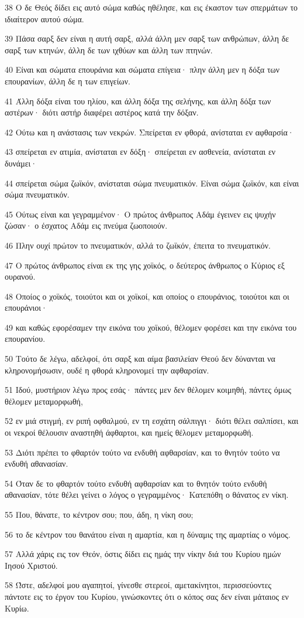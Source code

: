 \par 38 Ο δε Θεός δίδει εις αυτό σώμα καθώς ηθέλησε, και εις έκαστον των σπερμάτων το ιδιαίτερον αυτού σώμα.
\par 39 Πάσα σαρξ δεν είναι η αυτή σαρξ, αλλά άλλη μεν σαρξ των ανθρώπων, άλλη δε σαρξ των κτηνών, άλλη δε των ιχθύων και άλλη των πτηνών.
\par 40 Είναι και σώματα επουράνια και σώματα επίγεια· πλην άλλη μεν η δόξα των επουρανίων, άλλη δε η των επιγείων.
\par 41 Άλλη δόξα είναι του ηλίου, και άλλη δόξα της σελήνης, και άλλη δόξα των αστέρων· διότι αστήρ διαφέρει αστέρος κατά την δόξαν.
\par 42 Ούτω και η ανάστασις των νεκρών. Σπείρεται εν φθορά, ανίσταται εν αφθαρσία·
\par 43 σπείρεται εν ατιμία, ανίσταται εν δόξη· σπείρεται εν ασθενεία, ανίσταται εν δυνάμει·
\par 44 σπείρεται σώμα ζωϊκόν, ανίσταται σώμα πνευματικόν. Είναι σώμα ζωϊκόν, και είναι σώμα πνευματικόν.
\par 45 Ούτως είναι και γεγραμμένον· Ο πρώτος άνθρωπος Αδάμ έγεινεν εις ψυχήν ζώσαν· ο έσχατος Αδάμ εις πνεύμα ζωοποιούν.
\par 46 Πλην ουχί πρώτον το πνευματικόν, αλλά το ζωϊκόν, έπειτα το πνευματικόν.
\par 47 Ο πρώτος άνθρωπος είναι εκ της γης χοϊκός, ο δεύτερος άνθρωπος ο Κύριος εξ ουρανού.
\par 48 Οποίος ο χοϊκός, τοιούτοι και οι χοϊκοί, και οποίος ο επουράνιος, τοιούτοι και οι επουράνιοι·
\par 49 και καθώς εφορέσαμεν την εικόνα του χοϊκού, θέλομεν φορέσει και την εικόνα του επουρανίου.
\par 50 Τούτο δε λέγω, αδελφοί, ότι σαρξ και αίμα βασιλείαν Θεού δεν δύνανται να κληρονομήσωσιν, ουδέ η φθορά κληρονομεί την αφθαρσίαν.
\par 51 Ιδού, μυστήριον λέγω προς εσάς· πάντες μεν δεν θέλομεν κοιμηθή, πάντες όμως θέλομεν μεταμορφωθή,
\par 52 εν μιά στιγμή, εν ριπή οφθαλμού, εν τη εσχάτη σάλπιγγι· διότι θέλει σαλπίσει, και οι νεκροί θέλουσιν αναστηθή άφθαρτοι, και ημείς θέλομεν μεταμορφωθή.
\par 53 Διότι πρέπει το φθαρτόν τούτο να ενδυθή αφθαρσίαν, και το θνητόν τούτο να ενδυθή αθανασίαν.
\par 54 Όταν δε το φθαρτόν τούτο ενδυθή αφθαρσίαν και το θνητόν τούτο ενδυθή αθανασίαν, τότε θέλει γείνει ο λόγος ο γεγραμμένος· Κατεπόθη ο θάνατος εν νίκη.
\par 55 Που, θάνατε, το κέντρον σου; που, άδη, η νίκη σου;
\par 56 το δε κέντρον του θανάτου είναι η αμαρτία, και η δύναμις της αμαρτίας ο νόμος.
\par 57 Αλλά χάρις εις τον Θεόν, όστις δίδει εις ημάς την νίκην διά του Κυρίου ημών Ιησού Χριστού.
\par 58 Ώστε, αδελφοί μου αγαπητοί, γίνεσθε στερεοί, αμετακίνητοι, περισσεύοντες πάντοτε εις το έργον του Κυρίου, γινώσκοντες ότι ο κόπος σας δεν είναι μάταιος εν Κυρίω.

